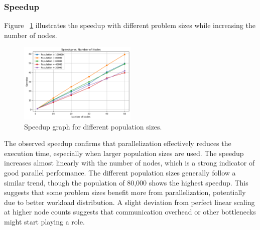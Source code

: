 \subsubsection{Speedup}
Figure ~\ref{fig:nodes_speedup} illustrates the speedup with different problem sizes while increasing the number of nodes.
\newline
\begin{figure}[h]
    \centering
    \includegraphics[width=0.5\textwidth]{figures/speedup_vs_nodes.png} %
    \caption{Speedup graph for different population sizes.}
    \label{fig:nodes_speedup}
\end{figure}
The observed speedup confirms that parallelization effectively reduces the execution time, especially when larger population sizes are used. The speedup increases almost linearly with the number of nodes, which is a strong indicator of good parallel performance.
The different population sizes generally follow a similar trend, though the population of 80,000 shows the highest speedup. This suggests that some problem sizes benefit more from parallelization, potentially due to better workload distribution.
A slight deviation from perfect linear scaling at higher node counts suggests that communication overhead or other bottlenecks might start playing a role.

